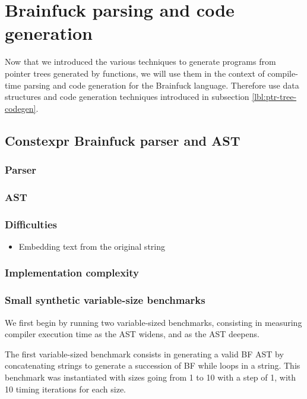 \documentclass[../main]{subfiles}
\begin{document}
\section{
  Brainfuck parsing and code generation
}

Now that we introduced the various techniques to generate programs from
pointer trees generated by \constexpr functions, we will use them in the
context of compile-time parsing and code generation for the Brainfuck language.
Therefore use data structures and code generation techniques introduced in
subsection \ref{lbl:ptr-tree-codegen}.

\subsection{
  Constexpr Brainfuck parser and AST
}

\subsubsection{
  Parser
}

\subsubsection{
  AST
}

\subsubsection{
  Difficulties
}

\begin{itemize}
\item Embedding text from the original string
\end{itemize}


\subsubsection{
  Implementation complexity
}

\subsubsection{
  Small synthetic variable-size benchmarks
}

We first begin by running two variable-sized benchmarks, consisting in
measuring compiler execution time as the AST widens, and as the AST deepens.

The first variable-sized benchmark consists in generating a valid BF AST by
concatenating strings to generate a succession of BF while loops in a
\constexpr string. This benchmark was instantiated with sizes going from 1 to
10 with a step of 1, with 10 timing iterations for each size.
\end{document}
